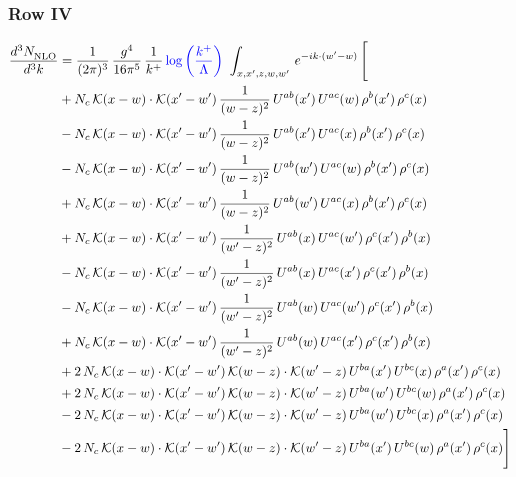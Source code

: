 \documentclass[9pt]{article}
\numberwithin{equation}{section}
\begin{document}
\subsubsection{Row IV}
\begin{align}
    \frac{d^{3}N_{\rm NLO}^{\rm}}{d^{3}k}  & = \frac{1}{(2\pi)^{3}}\,\frac{g^{4}}{16\pi^{5}}\,\frac{1}{k^{+}}\,{\color{blue}\log{\left(\frac{k^{+}}{\Lambda}\right)}}\,\,\int_{x,x',z,w,w'}\,e^{-ik\cdot(w'-w)}\,\Bigg[\notag \\ & +N_{c}\,\mathcal{K}(x-w)\cdot\mathcal{K}(x'-w')\,\frac{1}{(w-z)^{2}}\,U^{ab}(x')\,U^{ac}(w)\,\rho^{b}(x')\,\rho^{c}(x)\notag\\
&-N_{c}\,\mathcal{K}(x-w)\cdot\mathcal{K}(x'-w')\,\frac{1}{(w-z)^{2}}\,U^{ab}(x')\,U^{ac}(x)\,\rho^{b}(x')\,\rho^{c}(x)\notag\\
&-N_{c}\,\mathcal{K}(x-w)\cdot\mathcal{K}(x'-w')\,\frac{1}{(w-z)^{2}}\,U^{ab}(w')\,U^{ac}(w)\,\rho^{b}(x')\,\rho^{c}(x)\notag\\
&+N_{c}\,\mathcal{K}(x-w)\cdot\mathcal{K}(x'-w')\,\frac{1}{(w-z)^{2}}\,U^{ab}(w')\,U^{ac}(x)\,\rho^{b}(x')\,\rho^{c}(x)\notag\\
&+N_{c}\,\mathcal{K}(x-w)\cdot\mathcal{K}(x'-w')\,\frac{1}{(w'-z)^{2}}\,U^{ab}(x)\,U^{ac}(w')\,\rho^{c}(x')\,\rho^{b}(x)\notag\\
&-N_{c}\,\mathcal{K}(x-w)\cdot\mathcal{K}(x'-w')\,\frac{1}{(w'-z)^{2}}\,U^{ab}(x)\,U^{ac}(x')\,\rho^{c}(x')\,\rho^{b}(x)\notag\\
&-N_{c}\,\mathcal{K}(x-w)\cdot\mathcal{K}(x'-w')\,\frac{1}{(w'-z)^{2}}\,U^{ab}(w)\,U^{ac}(w')\,\rho^{c}(x')\,\rho^{b}(x)\notag\\
&+N_{c}\,\mathcal{K}(x-w)\cdot\mathcal{K}(x'-w')\,\frac{1}{(w'-z)^{2}}\,U^{ab}(w)\,U^{ac}(x')\,\rho^{c}(x')\,\rho^{b}(x)\notag\\
&+2\,N_{c}\,\mathcal{K}(x-w)\cdot\mathcal{K}(x'-w')\,\mathcal{K}(w-z)\cdot\mathcal{K}(w'-z)\,U^{ba}(x')\,U^{bc}(x)\,\rho^{a}(x')\,\rho^{c}(x)\notag\\
&+2\,N_{c}\,\mathcal{K}(x-w)\cdot\mathcal{K}(x'-w')\,\mathcal{K}(w-z)\cdot\mathcal{K}(w'-z)\,U^{ba}(w')\,U^{bc}(w)\,\rho^{a}(x')\,\rho^{c}(x)\notag\\
&-2\,N_{c}\,\mathcal{K}(x-w)\cdot\mathcal{K}(x'-w')\,\mathcal{K}(w-z)\cdot\mathcal{K}(w'-z)\,U^{ba}(w')\,U^{bc}(x)\,\rho^{a}(x')\,\rho^{c}(x)\notag\\
&-2\,N_{c}\,\mathcal{K}(x-w)\cdot\mathcal{K}(x'-w')\,\mathcal{K}(w-z)\cdot\mathcal{K}(w'-z)\,U^{ba}(x')\,U^{bc}(w)\,\rho^{a}(x')\,\rho^{c}(x)\Bigg]
\end{align}
\end{document}
